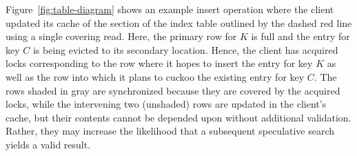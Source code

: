 Figure~\ref{fig:table-diagram} shows an example insert
operation where the client updated its cache of the section
of the index table outlined by the dashed red line using a
single covering read.  Here, the primary row for $K$ is full
and the entry for key $C$ is being evicted to its secondary
location.  Hence, the client has acquired locks
corresponding to the row where it hopes to insert the entry
for key $K$ as well as the row into which it plans to cuckoo
the existing entry for key $C$.  The rows shaded in gray are
synchronized because they are covered by the acquired locks,
while the intervening two (unshaded) rows are updated in the
client's cache, but their contents cannot be depended upon
without additional validation.  Rather, they may increase
the likelihood that a subsequent speculative search yields a
valid result.

